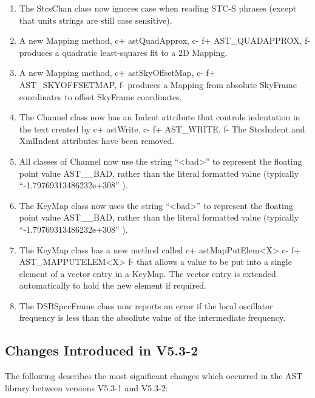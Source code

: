 \documentclass[twoside,11pt]{article}
\begin{document}
\begin{enumerate}
\item The StcsChan class now ignores case when reading STC-S phrases (except
that units strings are still case sensitive).

\item A new Mapping method,
c+
astQuadApprox,
c-
f+
AST\_QUADAPPROX,
f-
produces a quadratic least-squares fit to a 2D Mapping.

\item A new Mapping method,
c+
astSkyOffsetMap,
c-
f+
AST\_SKYOFFSETMAP,
f-
produces a Mapping from absolute SkyFrame coordinates to offset SkyFrame
coordinates.

\item The Channel class now has an Indent attribute that controls indentation
in the text created by
c+
astWrite.
c-
f+
AST\_WRITE.
f-
The StcsIndent and XmlIndent attributes have been removed.

\item All classes of Channel now use the string ``<bad>'' to represent the
floating point value AST\_\_BAD, rather than the literal formatted value
(typically ``-1.79769313486232e+308'' ).

\item The KeyMap class now uses the string ``<bad>'' to represent the
floating point value AST\_\_BAD, rather than the literal formatted value
(typically ``-1.79769313486232e+308'' ).

\item The KeyMap class has a new method called
c+
astMapPutElem<X>
c-
f+
AST\_MAPPUTELEM<X>
f-
that allows a value to be put into a single element of a vector entry in
a KeyMap. The vector entry is extended automatically to hold the new
element if required.

\item The DSBSpecFrame class now reports an error if the local oscillator
frequency is less than the absoliute value of the intermediate frequency.

\end{enumerate}


\subsection{Changes Introduced in V5.3-2}

The following describes the most significant changes which
occurred in the AST library between versions V5.3-1 and V5.3-2:
\end{document}
